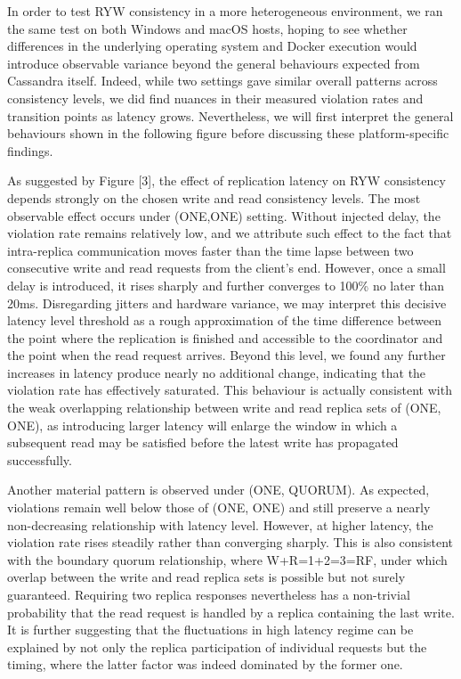 In order to test RYW consistency in a more heterogeneous environment, we ran the same test on both Windows and macOS hosts, hoping to see whether differences in the underlying operating system and Docker execution would introduce observable variance beyond the general behaviours expected from Cassandra itself. Indeed, while two settings gave similar overall patterns across consistency levels, we did find nuances in their measured violation rates and transition points as latency grows. Nevertheless, we will first interpret the general behaviours shown in the following figure before discussing these platform-specific findings.

As suggested by Figure {[}3{]}, the effect of replication latency on RYW consistency depends strongly on the chosen write and read consistency levels. The most observable effect occurs under (ONE,ONE) setting. Without injected delay, the violation rate remains relatively low, and we attribute such effect to the fact that intra-replica communication moves faster than the time lapse between two consecutive write and read requests from the client's end. However, once a small delay is introduced, it rises sharply and further converges to 100\% no later than 20ms. Disregarding jitters and hardware variance, we may interpret this decisive latency level threshold as a rough approximation of the time difference between the point where the replication is finished and accessible to the coordinator and the point when the read request arrives. Beyond this level, we found any further increases in latency produce nearly no additional change, indicating that the violation rate has effectively saturated. This behaviour is actually consistent with the weak overlapping relationship between write and read replica sets of (ONE, ONE), as introducing larger latency will enlarge the window in which a subsequent read may be satisfied before the latest write has propagated successfully.

Another material pattern is observed under (ONE, QUORUM). As expected, violations remain well below those of (ONE, ONE) and still preserve a nearly non-decreasing relationship with latency level. However, at higher latency, the violation rate rises steadily rather than converging sharply. This is also consistent with the boundary quorum relationship, where W+R=1+2=3=RF, under which overlap between the write and read replica sets is possible but not surely guaranteed. Requiring two replica responses nevertheless has a non-trivial probability that the read request is handled by a replica containing the last write. It is further suggesting that the fluctuations in high latency regime can be explained by not only the replica participation of individual requests but the timing, where the latter factor was indeed dominated by the former one.


